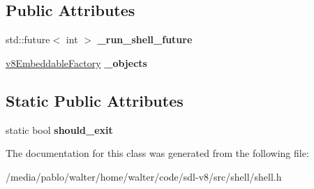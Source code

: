 \subsection*{Public Attributes}
\begin{DoxyCompactItemize}
\item 
\mbox{\label{classv8Shell_aeba5e5c80bbfad5e512b8b17919e6aef}} 
std\+::future$<$ int $>$ {\bfseries \+\_\+run\+\_\+shell\+\_\+future}
\item 
\mbox{\label{classv8Shell_ac3d25e32eb59487e57503dcf4e11f1cc}} 
\mbox{\hyperlink{classv8EmbeddableFactory}{v8\+Embeddable\+Factory}} {\bfseries \+\_\+objects}
\end{DoxyCompactItemize}
\subsection*{Static Public Attributes}
\begin{DoxyCompactItemize}
\item 
\mbox{\label{classv8Shell_a470bbf02f406e47704a6a8cc29d0b439}} 
static bool {\bfseries should\+\_\+exit}
\end{DoxyCompactItemize}


The documentation for this class was generated from the following file\+:\begin{DoxyCompactItemize}
\item 
/media/pablo/walter/home/walter/code/sdl-\/v8/src/shell/shell.\+h\end{DoxyCompactItemize}
